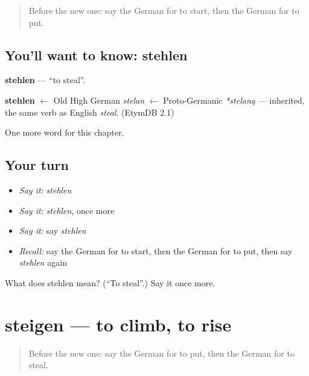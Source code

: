 \label{lesson:GE-C187-stehlen}



\begin{quote}
Before the new one: say the German for to start, then the German for to put.
\end{quote}

\subsection*{You'll want to know: stehlen}
\textbf{stehlen} — \textquotedblleft{}to steal\textquotedblright{}.

\begin{cousinweb}
\textbf{stehlen} $\leftarrow$ Old High German \emph{stelan} $\leftarrow$ Proto-Germanic \emph{*stelaną} — inherited, the same verb as English \emph{steal}. (EtymDB 2.1)
\end{cousinweb}

\begin{grammarlens}[title={What you've built}]
One more word for this chapter.
\end{grammarlens}

\subsection*{Your turn}
\begin{itemize}
\raggedright
  \item \emph{Say it:} \emph{stehlen}
  \item \emph{Say it:} \emph{stehlen}, once more
  \item \emph{Say it:} say \emph{stehlen}
  \item \emph{Recall:} say the German for to start, then the German for to put, then say \emph{stehlen} again
\end{itemize}

\begin{tcolorbox}[breakable,colback=teal!4,colframe=teal!35!black,title={Before you move on}]
What does stehlen mean? (\textquotedblleft{}To steal\textquotedblright{}.) Say it once more.
\end{tcolorbox}
\section[steigen]{steigen — to climb, to rise}

\label{lesson:GE-C187-steigen}



\begin{quote}
Before the new one: say the German for to put, then the German for to steal.
\end{quote}

